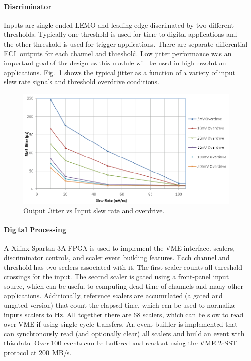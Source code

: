 \paragraph{Discriminator}
Inputs are single-ended LEMO and leading-edge discrimated by two different thresholds. Typically one threshold is used for time-to-digital applications and the other threshold is used for trigger applications. There are separate differential ECL outputs for each channel and threshold. Low jitter performance was an important goal of the design as this module will be used in high resolution applications. Fig.~\ref{fig:dsc2_jitter} shows the typical jitter as a function of a variety of input slew rate signals and threshold overdrive conditions.

\begin{figure}[hbt]
	\centering
	\includegraphics[width=1.0\columnwidth,keepaspectratio]{img/dsc2_jitter.png}
	\caption{Output Jitter vs Input slew rate and overdrive.}
	\label{fig:dsc2_jitter}
\end{figure}

\paragraph{Digital Processing}
A Xilinx Spartan 3A FPGA is used to implement the VME interface, scalers, discriminator controls, and scaler event building features. Each channel and threshold has two scalers associated with it. The first scaler counts all threshold crossings for the input. The second scaler is gated using a front-panel input source, which can be useful to computing dead-time of channels and many other applications. Additionally, reference scalers are accumulated (a gated and ungated version) that count the elapsed time, which can be used to normalize inputs scalers to Hz. All together there are 68 scalers, which can be slow to read over VME if using single-cycle transfers. An event builder is implemented that can synchronously read (and optionally clear) all scalers and build an event with this data. Over 100 events can be buffered and readout using the VME 2eSST protocol at 200~MB/s.


